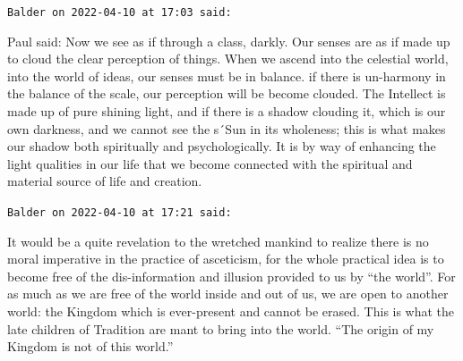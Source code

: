 \begin{footnotesize}
\begin{sffamily}
\texttt{Balder on 2022-04-10 at 17:03 said:}

Paul said: Now we see as if through a class, darkly. Our senses are as if made up to cloud the clear perception of things. When we ascend into the celestial world, into the world of ideas, our senses must be in balance. if there is un-harmony in the balance of the scale, our perception will be become clouded. The Intellect is made up of pure shining light, and if there is a shadow clouding it, which is our own darkness, and we cannot see the s´Sun in its wholeness; this is what makes our shadow both spiritually and psychologically. It is by way of enhancing the light qualities in our life that we become connected with the spiritual and material source of life and creation.

\hfill

\texttt{Balder on 2022-04-10 at 17:21 said:}

It would be a quite revelation to the wretched mankind to realize there is no moral imperative in the practice of asceticism, for the whole practical idea is to become free of the dis-information and illusion provided to us by ``the world''. For as much as we are free of the world inside and out of us, we are open to another world: the Kingdom which is ever-present and cannot be erased. This is what the late children of Tradition are mant to bring into the world. ``The origin of my Kingdom is not of this world.''

\end{sffamily}
\end{footnotesize}

